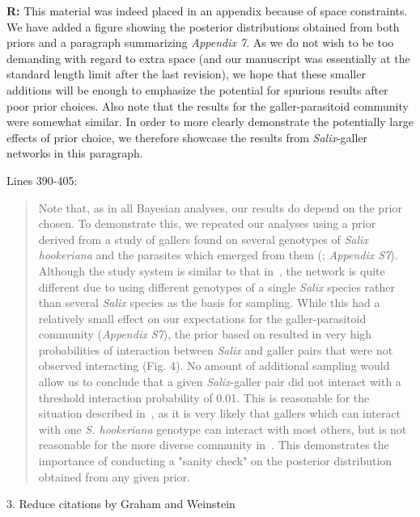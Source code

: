 \documentclass[12pt]{letter}
\begin{document}
		\textbf{R:} This material was indeed placed in an appendix because of space constraints. We have added a figure showing the posterior distributions obtained from both priors and a paragraph summarizing \emph{Appendix 7}. As we do not wish to be too demanding with regard to extra space (and our manuscript was essentially at the standard length limit after the last revision), we hope that these smaller additions will be enough to emphasize the potential for spurious results after poor prior choices. Also note that the results for the galler-parasitoid community were somewhat similar. In order to more clearly demonstrate the potentially large effects of prior choice, we therefore showcase the results from \emph{Salix}-galler networks in this paragraph.


		Lines 390-405:

		\begin{quotation}

		  Note that, as in all Bayesian analyses, our results do depend on the prior chosen. To demonstrate this, we repeated our analyses using a prior derived from a study of gallers found on several genotypes of \emph{Salix hookeriana} and the parasites which emerged from them (\citealp{Barbour2016,Barbour2016Dryad}; \emph{Appendix S7}). Although the study system is similar to that in~\citet{Kopelke2017}, the network is quite different due to using different genotypes of a single \emph{Salix} species rather than several \emph{Salix} species as the basis for sampling. While this had a relatively small effect on our expectations for the galler-parasitoid community (\emph{Appendix S7}), the prior based on \citep{Barbour2016} resulted in very high probabilities of interaction between \emph{Salix} and galler pairs that were not observed interacting (Fig. 4). No amount of additional sampling would allow us to conclude that a given \emph{Salix}-galler pair did not interact with a threshold interaction probability of 0.01. This is reasonable for the situation described in~\citet{Barbour2016}, as it is very likely that gallers which can interact with one \emph{S. hookeriana} genotype can interact with most others, but is not reasonable for the more diverse community in~\citet{Kopelke2017}. This demonstrates the importance of conducting a "sanity check" on the posterior distribution obtained from any given prior.

		\end{quotation}



	3. Reduce citations by Graham and Weinstein 
\end{document}
